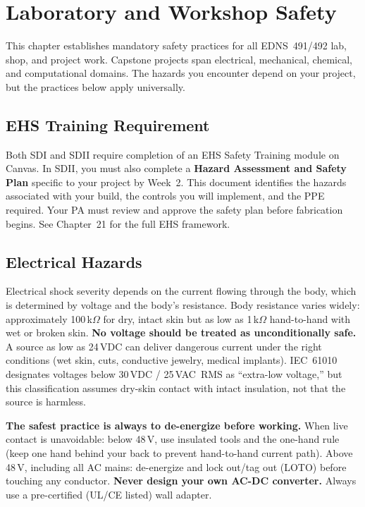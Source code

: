 \chapter*{Laboratory and Workshop Safety}

This chapter establishes mandatory safety practices for all EDNS~491/492 lab, shop, and project work. Capstone projects span electrical, mechanical, chemical, and computational domains. The hazards you encounter depend on your project, but the practices below apply universally.

\section*{EHS Training Requirement}
Both SDI and SDII require completion of an EHS Safety Training module on Canvas. In SDII, you must also complete a \textbf{Hazard Assessment and Safety Plan} specific to your project by Week~2. This document identifies the hazards associated with your build, the controls you will implement, and the PPE required. Your PA must review and approve the safety plan before fabrication begins. See Chapter~21 for the full EHS framework.

\section*{Electrical Hazards}
Electrical shock severity depends on the current flowing through the body, which is determined by voltage and the body's resistance. Body resistance varies widely: approximately 100\,k$\Omega$ for dry, intact skin but as low as 1\,k$\Omega$ hand-to-hand with wet or broken skin. \textbf{No voltage should be treated as unconditionally safe.} A source as low as 24\,VDC can deliver dangerous current under the right conditions (wet skin, cuts, conductive jewelry, medical implants). IEC~61010 designates voltages below 30\,VDC / 25\,VAC~RMS as ``extra-low voltage,'' but this classification assumes dry-skin contact with intact insulation, not that the source is harmless.

\textbf{The safest practice is always to de-energize before working.} When live contact is unavoidable: below 48\,V, use insulated tools and the one-hand rule (keep one hand behind your back to prevent hand-to-hand current path). Above 48\,V, including all AC mains: de-energize and lock out/tag out (LOTO) before touching any conductor. \textbf{Never design your own AC-DC converter.} Always use a pre-certified (UL/CE listed) wall adapter.

